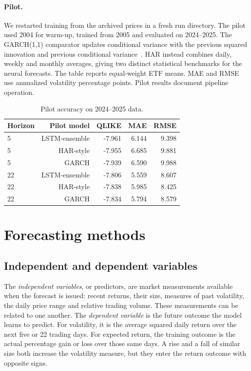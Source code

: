 \documentclass[11pt]{article}
\begin{document}
\paragraph{Pilot.} We restarted training from the archived prices in a fresh run directory. The pilot used 2004 for warm-up, trained from 2005 and evaluated on 2024--2025. The GARCH(1,1) comparator updates conditional variance with the previous squared innovation and previous conditional variance~\cite{garch}. HAR instead combines daily, weekly and monthly averages, giving two distinct statistical benchmarks for the neural forecasts. The table reports equal-weight ETF means. MAE and RMSE use annualized volatility percentage points. Pilot results document pipeline operation.
\begin{table}[htbp]\centering\small\setlength{\tabcolsep}{4pt}\caption{Pilot accuracy on 2024--2025 data.}\label{tab:pilot}
\begin{tabular}{lrrrr}
\hline
Horizon & Pilot model & QLIKE & MAE & RMSE \\
\hline
5 & LSTM-ensemble & -7.961 & 6.144 & 9.398 \\
5 & HAR-style & -7.955 & 6.685 & 9.881 \\
5 & GARCH & -7.939 & 6.590 & 9.988 \\
22 & LSTM-ensemble & -7.806 & 5.559 & 8.607 \\
22 & HAR-style & -7.838 & 5.985 & 8.425 \\
22 & GARCH & -7.834 & 5.794 & 8.579 \\
\hline
\end{tabular}\end{table}
\section{Forecasting methods}
\subsection{Independent and dependent variables}
The \emph{independent variables}, or predictors, are market measurements available when the forecast is issued: recent returns, their size, measures of past volatility, the daily price range and relative trading volume. These measurements can be related to one another. The \emph{dependent variable} is the future outcome the model learns to predict. For volatility, it is the average squared daily return over the next five or 22 trading days. For expected return, the training outcome is the actual percentage gain or loss over those same days. A rise and a fall of similar size both increase the volatility measure, but they enter the return outcome with opposite signs.
\end{document}
